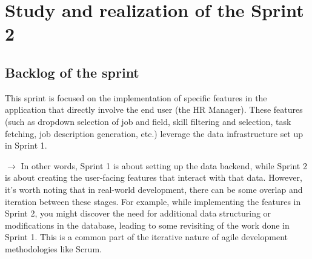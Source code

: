 \chapter{Study and realization of the Sprint 2}
\minitoc
\newpage


\setcounter{secnumdepth}{2} %
\section{Backlog of the sprint}
This sprint is focused on the implementation of specific features in the application that directly involve the end user (the HR Manager). These features (such as dropdown selection of job and field, skill filtering and selection, task fetching, job description generation, etc.) leverage the data infrastructure set up in Sprint 1.

$ \rightarrow $ In other words, Sprint 1 is about setting up the data backend, while Sprint 2 is about creating the user-facing features that interact with that data.
However, it's worth noting that in real-world development, there can be some overlap and iteration between these stages. For example, while implementing the features in Sprint 2, you might discover the need for additional data structuring or modifications in the database, leading to some revisiting of the work done in Sprint 1. This is a common part of the iterative nature of agile development methodologies like Scrum.

\renewcommand{\arraystretch}{1.5}
\setlength{\tabcolsep}{10pt}


